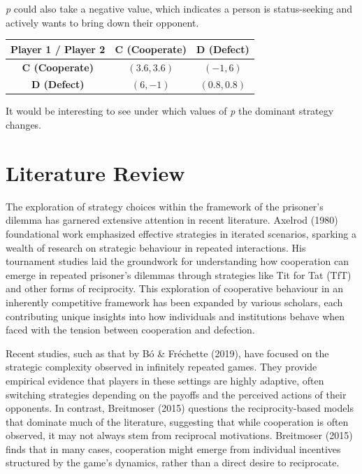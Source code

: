 \documentclass[11pt,preprint]{elsarticle}
\let\origtable\table
\let\endorigtable\endtable
\renewenvironment{table}[1][2] {
    \expandafter\origtable\expandafter[H]
} {
    \endorigtable
}
\numberwithin{equation}{section}
\numberwithin{figure}{section}
\numberwithin{table}{section}
\begin{document}
\emph{p} could also take a negative value, which indicates a person is
status-seeking and actively wants to bring down their opponent.

\begin{table}[ht]
\centering
\begin{tabular}{|c|c|c|}
\hline
\textbf{Player 1 / Player 2} & \textbf{C (Cooperate)} & \textbf{D (Defect)} \\
\hline
\textbf{C (Cooperate)} & $(3.6, 3.6)$ & $(-1, 6)$ \\
\hline
\textbf{D (Defect)} & $(6, -1)$ & $(0.8, 0.8)$ \\
\hline
\end{tabular}
\caption{Prisoner's Dilemma Payoff Matrix for $p = -0.2$ (Negative influence by others' outcomes)}
\end{table}

It would be interesting to see under which values of \emph{p} the
dominant strategy changes.

\hypertarget{literature-review}{%
\section{\texorpdfstring{Literature
Review\label{litreview}}{Literature Review}}\label{literature-review}}

The exploration of strategy choices within the framework of the
prisoner's dilemma has garnered extensive attention in recent
literature. Axelrod (1980) foundational work emphasized effective
strategies in iterated scenarios, sparking a wealth of research on
strategic behaviour in repeated interactions. His tournament studies
laid the groundwork for understanding how cooperation can emerge in
repeated prisoner's dilemmas through strategies like Tit for Tat (TfT)
and other forms of reciprocity. This exploration of cooperative
behaviour in an inherently competitive framework has been expanded by
various scholars, each contributing unique insights into how individuals
and institutions behave when faced with the tension between cooperation
and defection.

Recent studies, such as that by Bó \& Fréchette (2019), have focused on
the strategic complexity observed in infinitely repeated games. They
provide empirical evidence that players in these settings are highly
adaptive, often switching strategies depending on the payoffs and the
perceived actions of their opponents. In contrast, Breitmoser (2015)
questions the reciprocity-based models that dominate much of the
literature, suggesting that while cooperation is often observed, it may
not always stem from reciprocal motivations. Breitmoser (2015) finds
that in many cases, cooperation might emerge from individual incentives
structured by the game's dynamics, rather than a direct desire to
reciprocate.
\end{document}
